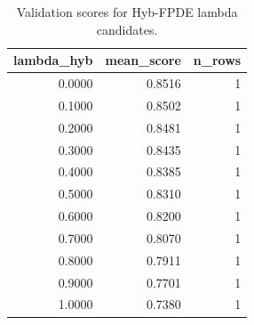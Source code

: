 \begin{table}[t]
\caption{Validation scores for Hyb-FPDE lambda candidates.}
\label{tab:lambda_distribution_computed}
\centering
\begin{tabular}{rrr}
\toprule
lambda\_hyb & mean\_score & n\_rows \\
\midrule
0.0000 & 0.8516 & 1 \\
0.1000 & 0.8502 & 1 \\
0.2000 & 0.8481 & 1 \\
0.3000 & 0.8435 & 1 \\
0.4000 & 0.8385 & 1 \\
0.5000 & 0.8310 & 1 \\
0.6000 & 0.8200 & 1 \\
0.7000 & 0.8070 & 1 \\
0.8000 & 0.7911 & 1 \\
0.9000 & 0.7701 & 1 \\
1.0000 & 0.7380 & 1 \\
\bottomrule
\end{tabular}

\end{table}
